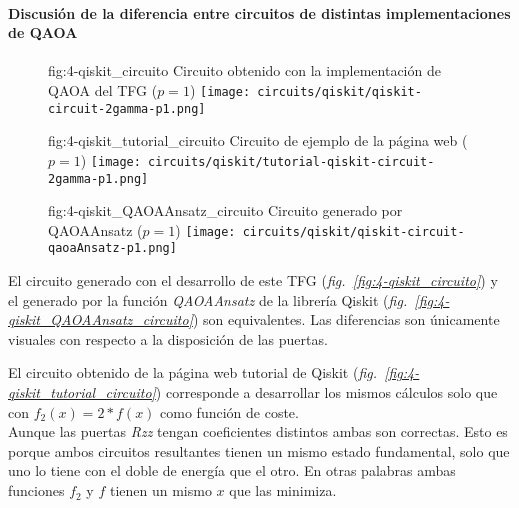 \paragraph{Discusión de la diferencia entre circuitos de distintas implementaciones de QAOA}

\begin{figure}[Circuito {--} max-cut en grafo de 4 aristas propio]{fig:4-qiskit_circuito}{ Circuito obtenido con la implementación de QAOA del TFG ($p=1$) }
  \centering
  \texttt{[image: circuits/qiskit/qiskit-circuit-2gamma-p1.png]}
\end{figure}

\begin{figure}[Circuito {--} max-cut en grafo de 4 aristas de la fuente]{fig:4-qiskit_tutorial_circuito}{ Circuito de ejemplo de la página web\cite{qiskit_tutorial_antiguo} ($p=1$) }
  \centering
  \texttt{[image: circuits/qiskit/tutorial-qiskit-circuit-2gamma-p1.png]}
\end{figure}

\begin{figure}[Circuito {--} max-cut en grafo de 4 aristas de QAOAAnsatz]{fig:4-qiskit_QAOAAnsatz_circuito}{ Circuito generado por QAOAAnsatz ($p=1$) }
  \centering
  \texttt{[image: circuits/qiskit/qiskit-circuit-qaoaAnsatz-p1.png]}
\end{figure}

El circuito generado con el desarrollo de este TFG (\textit{fig.~\ref{fig:4-qiskit_circuito}}) y el generado por la función \textit{QAOAAnsatz} de la librería Qiskit (\textit{fig.~\ref{fig:4-qiskit_QAOAAnsatz_circuito}}) son equivalentes.
Las diferencias son únicamente visuales con respecto a la disposición de las puertas.

El circuito obtenido de la página web tutorial de Qiskit\cite{qiskit_tutorial_antiguo} (\textit{fig.~\ref{fig:4-qiskit_tutorial_circuito}}) corresponde a desarrollar los mismos cálculos solo que con $f_2(x) = 2*f(x)$ como función de coste.
\\
Aunque las puertas \textit{Rzz} tengan coeficientes distintos ambas son correctas.
Esto es porque ambos circuitos resultantes tienen un mismo estado fundamental, solo que uno lo tiene con el doble de energía que el otro.
En otras palabras ambas funciones $f_2$ y $f$ tienen un mismo $x$ que las minimiza.


